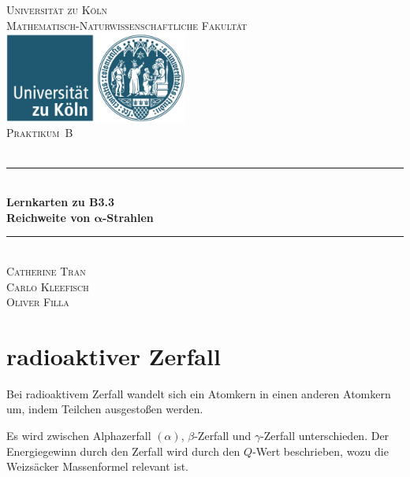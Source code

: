 \documentclass[12pt,a4paper]{scrartcl}
\numberwithin{equation}{section} %
\newcommand{\HRule}{\rule{\linewidth}{0.7mm}}
\renewcommand{\[}{} %
\renewcommand{\]}{\noindent} %
\begin{document}
\begin{titlepage}
	\pagestyle{empty}
	
	\begin{center}
		
		\textsc{\LARGE Universität zu Köln }\\ [0.4cm]
		\textsc{Mathematisch-Naturwissenschaftliche Fakultät} \\[1.5cm]
		
		\includegraphics[width=0.45\textwidth]{../media/uni.jpg}\\[1.5cm]  %
		
		\textsc{\Large Praktikum~B}\\[2mm]
		\textsc{}\\[10mm]
		\HRule \\[0.4cm]
		
		{	\Huge \bfseries Lernkarten zu B3.3}\\[0.4cm]
		{	\huge \bfseries Reichweite von \(\pmb{\alpha}\)-Strahlen}\\[0.3cm]
		
		\HRule \\[3cm]
		
		\textsc{\Large Catherine Tran } \\[3pt]
		\textsc{\Large Carlo Kleefisch } \\[3pt]
		\textsc{\Large Oliver Filla } \\[3pt]
	\end{center}
\end{titlepage}
\newpage
\tableofcontents
\newpage

\hypertarget{radioaktiver-zerfall}{%
\section{radioaktiver Zerfall}\label{radioaktiver-zerfall}}

Bei radioaktivem Zerfall wandelt sich ein Atomkern in einen anderen
Atomkern um, indem Teilchen ausgestoßen werden.

Es wird zwischen Alphazerfall \((\alpha)\), \(\beta\)-Zerfall und
\(\gamma\)-Zerfall unterschieden. Der Energiegewinn durch den Zerfall
wird durch den \(Q\)-Wert beschrieben, wozu die Weizsäcker Massenformel
relevant ist.
\end{document}
